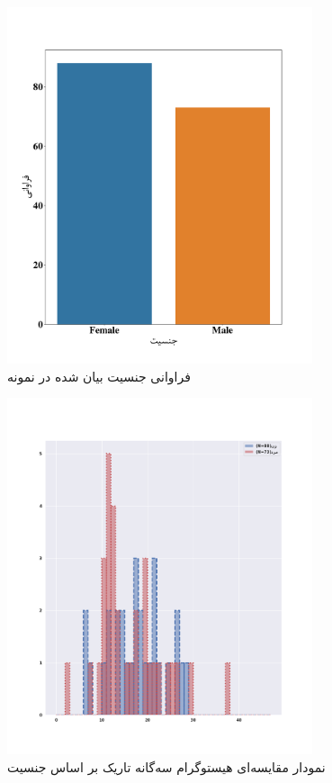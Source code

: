 % 

\begin{figure}[htpb]
    \centering
    \includegraphics[width=0.8\textwidth]{./img/sexualityAgainstPopulation.pdf}
    \caption{فراوانی جنسیت بیان شده در نمونه}
    \label{fig:sexualityAgainstPopulation}
\end{figure}
\begin{figure}[htpb]
    \centering
    \includegraphics[width=0.8\textwidth]{./img/BoxPlotDTRSVOType.png}
    \caption{نمودار مقایسه‌ای هیستوگرام سه‌گانه تاریک بر اساس جنسیت}
    \label{fig:BoxPlotDTRSVOType}
\end{figure}
